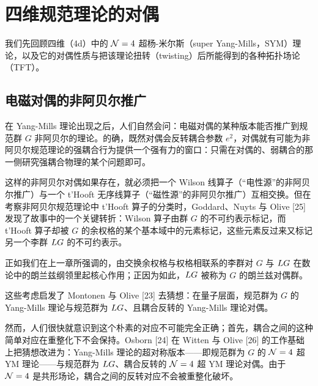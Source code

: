 \chapter{四维规范理论的对偶}

我们先回顾四维（4d）中的 $\mathcal{N}=4$ 超杨-米尔斯（super Yang-Mills，SYM）理论，以及它的对偶性质与把该理论扭转（twisting）后所能得到的各种拓扑场论（TFT）。

\section{电磁对偶的非阿贝尔推广}

在 Yang-Mills 理论出现之后，人们自然会问：电磁对偶的某种版本能否推广到规范群 $G$ 非阿贝尔的理论。的确，既然对偶会反转耦合参数 $e^2$，对偶就有可能为非阿贝尔规范理论的强耦合行为提供一个强有力的窗口：只需在对偶的、弱耦合的那一侧研究强耦合物理的某个问题即可。


这样的非阿贝尔对偶如果存在，就必须把一个 Wilson 线算子（“电性源”的非阿贝尔推广）与一个 t'Hooft 无序线算子（“磁性源”的非阿贝尔推广）互相交换。但在考察非阿贝尔规范理论中 t'Hooft 算子的分类时，Goddard、Nuyts 与 Olive [25] 发现了故事中的一个关键转折：Wilson 算子由群 $G$ 的不可约表示标记，而 t'Hooft 算子却被 $G$ 的余权格的某个基本域中的元素标记，这些元素反过来又标记另一个李群 $LG$ 的不可约表示。


正如我们在上一章所强调的，由交换余权格与权格相联系的李群对 $G$ 与 $LG$ 在数论中的朗兰兹纲领里起核心作用；正因为如此，$LG$ 被称为 $G$ 的朗兰兹对偶群。

这些考虑启发了 Montonen 与 Olive [23] 去猜想：在量子层面，规范群为 $G$ 的 Yang-Mills 理论与规范群为 $LG$、且耦合反转的 Yang-Mills 理论对偶。

然而，人们很快就意识到这个朴素的对应不可能完全正确；首先，耦合之间的这种简单对应在重整化下不会保持。Osborn [24] 在 Witten 与 Olive [26] 的工作基础上把猜想改进为：Yang-Mills 理论的超对称版本——即规范群为 $G$ 的 $\mathcal{N}=4$ 超 YM 理论——与规范群为 $LG$、耦合反转的 $\mathcal{N}=4$ 超 YM 理论对偶。由于 $\mathcal{N}=4$ 是共形场论，耦合之间的反转对应不会被重整化破坏。

